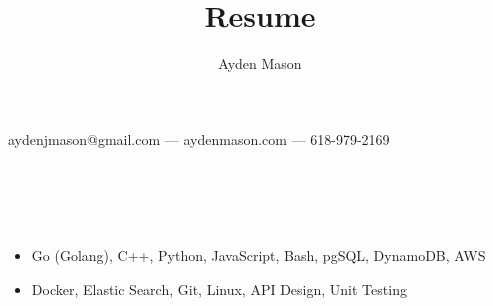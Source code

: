 \documentclass{article}
\makeatletter
\renewcommand{\maketitle}{

\begin{center}
{\huge\bfseries
\theauthor}


aydenjmason@gmail.com --- aydenmason.com --- 618-979-2169
\end{center}
}
\makeatother
\begin{document}
\bgroup\obeylines
\title{Resume}
\author{Ayden Mason}

\maketitle
\section{\\}
\color{black}
\begin{itemize}
\item Go (Golang), C++, Python, JavaScript, Bash, pgSQL, DynamoDB, AWS
\item Docker, Elastic Search, Git, Linux, API Design, Unit Testing
\end{itemize}
\end{document}
